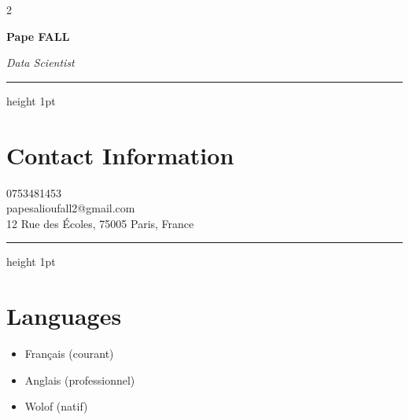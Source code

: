 \documentclass[10pt,letterpaper]{article}
\newcommand{\cvName}[1]{\vspace*{0.3in}\textbf{\LARGE #1}}
\newcommand{\cvHeadline}[1]{\par\smallskip\textit{#1}}
\newcommand{\cvHr}{\vspace{0.5\baselineskip}\hrule height 1pt\color{primary}\vspace{0.7\baselineskip}}
\begin{document}
\begin{paracol}{2}

\begin{leftcolumn}
\begin{center}
\end{center}

\vspace{0.6in}

\cvName{Pape FALL}
\cvHeadline{Data Scientist}

\cvHr

\section*{Contact Information}
0753481453\\
papesalioufall2@gmail.com\\
12 Rue des Écoles, 75005 Paris, France

\cvHr

\section*{Languages}
\begin{itemize}
  \item Français (courant)
  \item Anglais (professionnel)
  \item Wolof (natif)
\end{itemize}


\end{leftcolumn}
\end{paracol}
\end{document}
